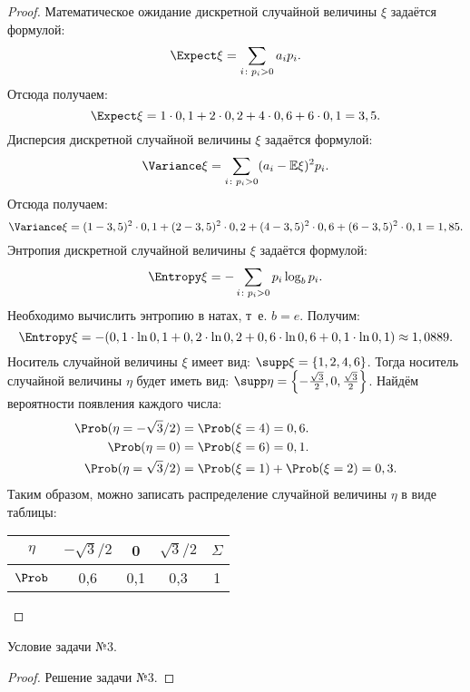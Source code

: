 \begin{proof}
	Математическое ожидание дискретной случайной величины $ \xi $ задаётся формулой:
	\[ \Expect\xi = \sum_{i \colon p_i > 0}a_ip_i. \]
	Отсюда получаем:
	\[ \Expect\xi = 1 \cdot 0,1 + 2 \cdot 0,2 + 4 \cdot 0,6 + 6 \cdot 0,1 = 3,5. \]
	Дисперсия дискретной случайной величины $ \xi $ задаётся формулой:
	\[ \Variance\xi = \sum_{i \colon p_i > 0}(a_i - \mathbb E\xi)^2p_i. \]
	Отсюда получаем:
	\[ \Variance\xi = (1 - 3,5)^2 \cdot 0,1 + (2 - 3,5)^2 \cdot 0,2 + (4 - 3,5)^2 \cdot 0,6 + (6 - 3,5)^2 \cdot 0,1 = 1,85. \]
	Энтропия дискретной случайной величины $ \xi $ задаётся формулой:
	\[ \Entropy\xi = -\sum_{i \colon p_i > 0}p_i\log_bp_i. \]
	Необходимо вычислить энтропию в натах, т~е. $ b = e $. Получим:
	\[ \Entropy\xi = -(0,1 \cdot \ln0,1 + 0,2 \cdot \ln0,2 + 0,6 \cdot \ln0,6 + 0,1 \cdot \ln0,1) \approx 1,0889. \]
	Носитель случайной величины $ \xi $ имеет вид: $ \supp \xi = \lbrace 1, 2, 4, 6 \rbrace $. Тогда носитель случайной величины $ \eta $ будет иметь вид: $ \supp \eta = \left\lbrace -\frac{\sqrt{3}}{2}, 0, \frac{\sqrt{3}}{2} \right\rbrace  $. Найдём вероятности появления каждого числа:
	\begin{align*}
		\Prob(\eta = -\sqrt{3}/2) &= \Prob(\xi = 4) = 0,6. \\
		\Prob(\eta = 0) &= \Prob(\xi = 6) = 0,1. \\
		\Prob(\eta = \sqrt{3}/2) &= \Prob(\xi = 1) + \Prob(\xi = 2) = 0,3.
	\end{align*}
	Таким образом, можно записать распределение случайной величины $ \eta $ в виде таблицы:
	\begin{center}
		\begin{tabular}{|c|c|c|c|c|}
			\hline
			$ \eta $  & $ -\sqrt{3}/2 $ & 0   & $ \sqrt{3}/2 $ & $ \Sigma $ \\ \hline
			$ \Prob $ & 0,6             & 0,1 & 0,3            & 1          \\ \hline
		\end{tabular}
	\end{center}
\end{proof}

\begin{problem}
	Условие задачи №3.
\end{problem}

\begin{proof}
	Решение задачи №3.
\end{proof}
